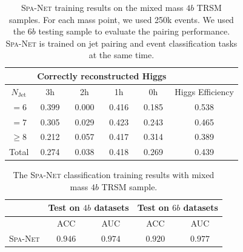 \documentclass[12pt]{article}
\begin{document}
    \begin{table}[htpb]
        \centering
        \caption{\textsc{Spa-Net} training results on the mixed mass $4b$ TRSM samples. For each mass point, we used 250k events. We used the $6b$ testing sample to evaluate the pairing performance. \textsc{Spa-Net} is trained on jet pairing and event classification tasks at the same time.}
        \label{tab:SPANet_triHiggs_TRSM_4b-mix_5-250k-cls_6b_pairing_results}
        \begin{tabular}{c|cccc|c}
                       & \multicolumn{4}{c|}{Correctly reconstructed Higgs} &                  \\ \hline
        $N_\text{Jet}$ & 3h          & 2h         & 1h         & 0h         & Higgs Efficiency \\ \hline
        $=6$           & 0.399 & 0.000 & 0.416 & 0.185 & 0.538             \\
        $=7$           & 0.305 & 0.029 & 0.423 & 0.243 & 0.465             \\
        $\ge 8$        & 0.212 & 0.057 & 0.417 & 0.314 & 0.389             \\ \hline
        Total          & 0.274 & 0.038 & 0.418 & 0.269 & 0.439 
        \end{tabular}
    \end{table}
    \begin{table}[htpb]
        \centering
        \caption{The \textsc{Spa-Net} classification training results with mixed mass $4b$ TRSM sample.}
        \label{tab:SPANet_triHiggs_TRSM_4b-mix_5-250k-cls_classification_results}
        \begin{tabular}{c|cc|cc}
                         & \multicolumn{2}{c|}{Test on $4b$ datasets}& \multicolumn{2}{c}{Test on $6b$ datasets} \\ \hline
                         & ACC                 & AUC                 & ACC                 & AUC                 \\ \hline
        \textsc{Spa-Net} & $0.946$             & $0.974$             & $0.920$             & $0.977$
        \end{tabular}
    \end{table}
\end{document}

